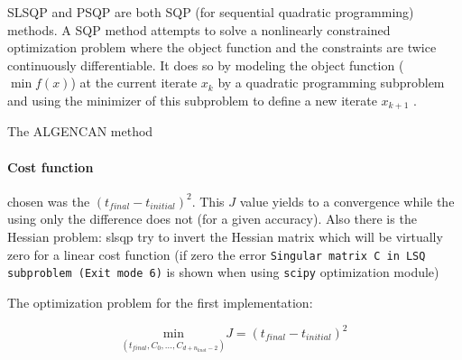 SLSQP and PSQP are both SQP (for sequential quadratic programming) methods. A SQP method attempts to solve a nonlinearly constrained optimization problem where the object function and the constraints are twice continuously differentiable. It does so by modeling the object function ($\min f(x)$) at the current iterate $x_k$ by a quadratic programming subproblem and using the minimizer of this subproblem to define a new iterate $x_{k+1}$ \cite{Nocedal}.

The ALGENCAN method





\paragraph{Cost function} chosen was the $(t_{final}-t_{initial})^2$. This $J$ value yields to a convergence while the using only the difference does not (for a given accuracy). Also there is the Hessian problem: slsqp try to invert the Hessian matrix which will be virtually zero for a linear cost function (if zero the error \texttt{Singular matrix C in LSQ subproblem (Exit mode 6)} is shown when using \texttt{scipy} optimization module)

The optimization problem for the first implementation:


\begin{equation}
	\underset{(t_{final},C_0,\dotsc,C_{d+n_{knot}-2})}{\mathrm{min}} J = (t_{final}-t_{initial})^{2}
\end{equation}

